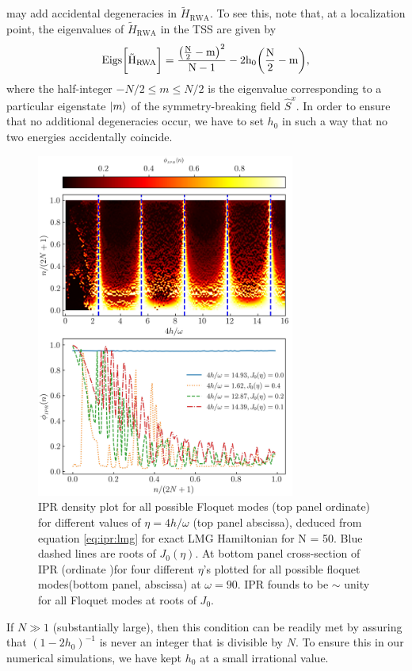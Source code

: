 \documentclass[%
reprint,
superscriptaddress,
linenumbers,
amsmath,amssymb,
aps,
prb,
showkeys,
]{revtex4-2}
\begin{document}
	 may add accidental degeneracies in $\tilde{H}_{\mathrm{RWA}}$. To see this, note that, at a localization point, the eigenvalues of $\tilde{H}_{\mathrm{RWA}}$ in the TSS are given by
	\begin{equation}
	\rm{Eigs}\bigg[\tilde{H}_{\mathrm{RWA}}\bigg] = \frac{\big(\frac{N}{2}-m\big)^2}{N-1} - 2h_0 \bigg(\frac{N}{2}-m\bigg),
	\end{equation}
	where the half-integer $-N/2\leq m \leq N/2$ is the eigenvalue corresponding to a particular eigenstate $\ket{m}$ of the symmetry-breaking field $\hat{S}^x$. In order to ensure that no additional degeneracies occur, we have to set $h_0$ in  such a way that no two energies accidentally coincide.
		\begin{figure}[t!]
		\centering
		\includegraphics[width = 8.5cm]{ipr_exact_dynm_N50_frq_90_.jpeg}
		\caption{IPR density plot for all possible Floquet modes (top panel ordinate) for different values of $\eta = 4h/\omega$ (top panel abscissa), deduced from equation \ref{eq:ipr:lmg} for exact LMG Hamiltonian for N = 50. Blue dashed lines are roots of $J_0(\eta)$. At bottom panel cross-section of IPR (ordinate )for four different $\eta$'s plotted for all possible floquet modes(bottom panel, abscissa) at $\omega=90$. IPR founds to be $\sim$ unity for all Floquet modes at roots of $J_0$.}
		\label{fig:lmg_ipr_exact}
	\end{figure}
	If $N\gg 1$ (substantially large), then this condition can be readily met by assuring that $(1-2h_0)^{-1}$ is never an integer that is divisible by $N$. To ensure this in our numerical simulations, we have kept $h_0$ at a small irrational value.
\end{document}
